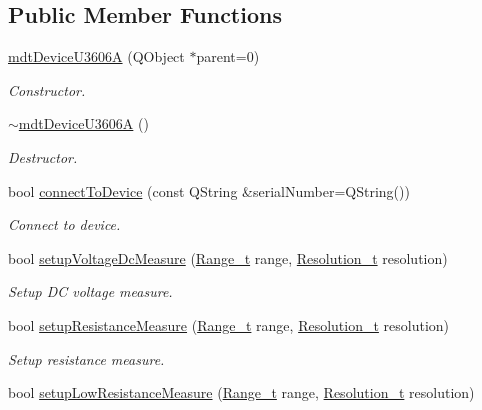 \subsection*{Public Member Functions}
\begin{DoxyCompactItemize}
\item 
\hyperlink{classmdt_device_u3606_a_a91201ae14df7b553a947b5857eaa1c65}{mdt\-Device\-U3606\-A} (Q\-Object $\ast$parent=0)
\begin{DoxyCompactList}\small\item\em Constructor. \end{DoxyCompactList}\item 
\hyperlink{classmdt_device_u3606_a_a7d2fb26475e72cce95ca6be384d569b7}{$\sim$mdt\-Device\-U3606\-A} ()
\begin{DoxyCompactList}\small\item\em Destructor. \end{DoxyCompactList}\item 
bool \hyperlink{classmdt_device_u3606_a_a8470e8f5f56ab635d2b2718a1bb54034}{connect\-To\-Device} (const Q\-String \&serial\-Number=Q\-String())
\begin{DoxyCompactList}\small\item\em Connect to device. \end{DoxyCompactList}\item 
bool \hyperlink{classmdt_device_u3606_a_af71cd0206a4f91fc1b250780ceb72919}{setup\-Voltage\-Dc\-Measure} (\hyperlink{classmdt_device_u3606_a_a8171d28878e8609c98d4cea591b7cc37}{Range\-\_\-t} range, \hyperlink{classmdt_device_u3606_a_a136af13281bde380abeabe358c399dc5}{Resolution\-\_\-t} resolution)
\begin{DoxyCompactList}\small\item\em Setup D\-C voltage measure. \end{DoxyCompactList}\item 
bool \hyperlink{classmdt_device_u3606_a_ac7b3bb6534b628cce4f465796b65c74f}{setup\-Resistance\-Measure} (\hyperlink{classmdt_device_u3606_a_a8171d28878e8609c98d4cea591b7cc37}{Range\-\_\-t} range, \hyperlink{classmdt_device_u3606_a_a136af13281bde380abeabe358c399dc5}{Resolution\-\_\-t} resolution)
\begin{DoxyCompactList}\small\item\em Setup resistance measure. \end{DoxyCompactList}\item 
bool \hyperlink{classmdt_device_u3606_a_a37ee631efe112bc57c3707f266880cec}{setup\-Low\-Resistance\-Measure} (\hyperlink{classmdt_device_u3606_a_a8171d28878e8609c98d4cea591b7cc37}{Range\-\_\-t} range, \hyperlink{classmdt_device_u3606_a_a136af13281bde380abeabe358c399dc5}{Resolution\-\_\-t} resolution)

\end{DoxyCompactItemize}
